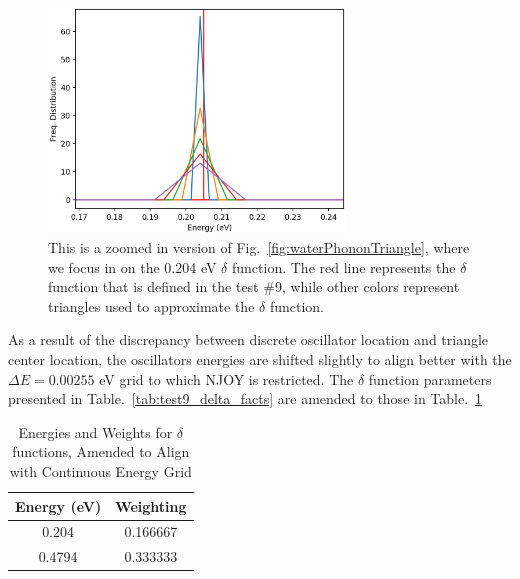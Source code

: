 \documentclass[Master.tex]{subfiles}
\begin{document}
    \begin{figure}[h]
      \begin{center}
        \includegraphics[width=0.7\textwidth]{waterPhononDistTrianglesZoomedb}
        \caption[Close-up of various triangles approximating 0.204 eV $\delta$ function]{This is a zoomed in version of Fig.~\ref{fig:waterPhononTriangle}, where we focus in on the 0.204 eV $\delta$ function. The red line represents the $\delta$ function that is defined in the test \#9, while other colors represent triangles used to approximate the $\delta$ function.}
        \label{fig:waterPhononTriangleZoomed}
      \end{center}
    \end{figure}
    As a result of the discrepancy between discrete oscillator location and triangle center location, the oscillators energies are shifted slightly to align better with the $\Delta E=0.00255$ eV grid to which NJOY is restricted. The $\delta$ function parameters presented in Table.~\ref{tab:test9_delta_facts} are amended to those in Table.~\ref{tab:amended_delta_facts}



    \begin{table}[H]
      \centering
      \caption[Energies and Weights for $\delta$ functions, Amended to Align with Continuous Energy Grid]{Energies and Weights for $\delta$ functions, Amended to Align with Continuous Energy Grid}
      \label{tab:amended_delta_facts}
      \begin{tabular}{ |c|c| }\hline
        Energy (eV)& Weighting\\\hline
        0.204& 0.166667\\\hline
        0.4794 & 0.333333 \\\hline
      \end{tabular}\\[1ex]
    \end{table}
\end{document}

